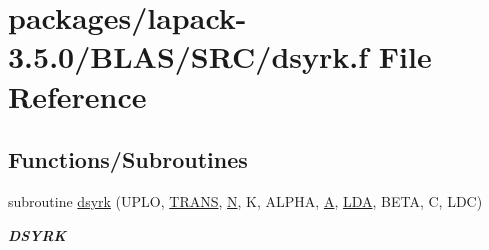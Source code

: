 \hypertarget{lapack-3_85_80_2BLAS_2SRC_2dsyrk_8f}{}\section{packages/lapack-\/3.5.0/\+B\+L\+A\+S/\+S\+R\+C/dsyrk.f File Reference}
\label{lapack-3_85_80_2BLAS_2SRC_2dsyrk_8f}
\subsection*{Functions/\+Subroutines}
\begin{DoxyCompactItemize}
\item 
subroutine \hyperlink{group__double__blas__level3_gae0ba56279ae3fa27c75fefbc4cc73ddf}{dsyrk} (U\+P\+L\+O, \hyperlink{superlu__enum__consts_8h_a0c4e17b2d5cea33f9991ccc6a6678d62a1f61e3015bfe0f0c2c3fda4c5a0cdf58}{T\+R\+A\+N\+S}, \hyperlink{polmisc_8c_a0240ac851181b84ac374872dc5434ee4}{N}, K, A\+L\+P\+H\+A, \hyperlink{classA}{A}, \hyperlink{example__user_8c_ae946da542ce0db94dced19b2ecefd1aa}{L\+D\+A}, B\+E\+T\+A, C, L\+D\+C)
\begin{DoxyCompactList}\small\item\em {\bfseries D\+S\+Y\+R\+K} \end{DoxyCompactList}\end{DoxyCompactItemize}
